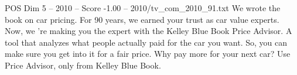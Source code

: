 \begin{textsample}{POS Dim 5 – 2010 – Score -1.00 – 2010/tv\_com\_2010\_91.txt}  \label{ex:f5_pos_080}
We wrote the book on car pricing.
For 90 years, we earned your trust as car value experts.
Now, we 're making you the expert with the Kelley Blue Book Price Advisor.
A tool that analyzes what people actually paid for the car you want.
So, you can make sure you get into it for a fair price.
Why pay more for your next car?
Use Price Advisor, only from Kelley Blue Book.

\end{textsample}
